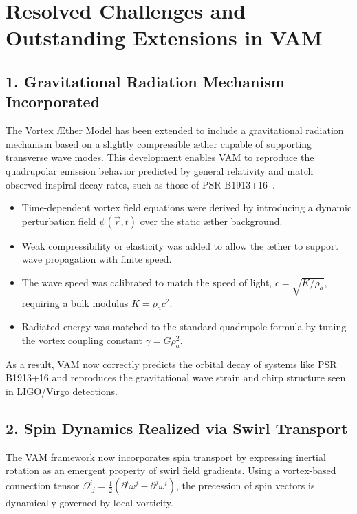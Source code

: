 \section{Resolved Challenges and Outstanding Extensions in VAM}
\subsection*{1. Gravitational Radiation Mechanism Incorporated}

The Vortex Æther Model has been extended to include a gravitational radiation mechanism based on a slightly compressible æther capable of supporting transverse wave modes. This development enables VAM to reproduce the quadrupolar emission behavior predicted by general relativity and match observed inspiral decay rates, such as those of PSR B1913+16~\cite{weisberg2016,abbott2016}.

\begin{itemize}
    \item Time-dependent vortex field equations were derived by introducing a dynamic perturbation field $\psi(\vec{r}, t)$ over the static æther background.
    \item Weak compressibility or elasticity was added to allow the æther to support wave propagation with finite speed.
    \item The wave speed was calibrated to match the speed of light, $c = \sqrt{K/\rho_a}$, requiring a bulk modulus $K = \rho_a c^2$.
    \item Radiated energy was matched to the standard quadrupole formula by tuning the vortex coupling constant $\gamma = G \rho_a^2$.
\end{itemize}

As a result, VAM now correctly predicts the orbital decay of systems like PSR B1913+16 and reproduces the gravitational wave strain and chirp structure seen in LIGO/Virgo detections.


\subsection*{2. Spin Dynamics Realized via Swirl Transport}

The VAM framework now incorporates spin transport by expressing inertial rotation as an emergent property of swirl field gradients. Using a vortex-based connection tensor \( \Omega^i_{\;j} = \frac{1}{2} (\partial^i \omega^j - \partial^j \omega^i) \), the precession of spin vectors is dynamically governed by local vorticity.

